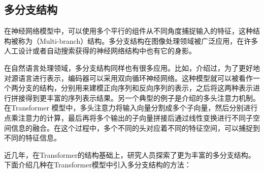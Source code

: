 \subsection{多分支结构}

\parinterval 在神经网络模型中，可以使用多个平行的组件从不同角度捕捉输入的特征，这种结构被称为{\small{}}（Multi-branch）结构。多分支结构在图像处理领域被广泛应用，在许多人工设计或者自动搜索获得的神经网络结构中也有它的身影。

\parinterval 在自然语言处理领域，多分支结构同样也有很多应用。比如，{\chapterten}介绍过，为了更好地对源语言进行表示，编码器可以采用双向循环神经网络。这种模型就可以被看作一个两分支的结构，分别用来建模正向序列和反向序列的表示，之后将这两种表示进行拼接得到更丰富的序列表示结果。另一个典型的例子是{\chaptertwelve}介绍的多头注意力机制。在Transformer 模型中，多头注意力将输入向量分割成多个子向量，然后分别进行点乘注意力的计算，最后再将多个输出的子向量拼接后通过线性变换进行不同子空间信息的融合。在这个过程中，多个不同的头对应着不同的特征空间，可以捕捉到不同的特征信息。

\parinterval 近几年，在Transformer的结构基础上，研究人员探索了更为丰富的多分支结构。下面介绍几种在Transformer模型中引入多分支结构的方法：

